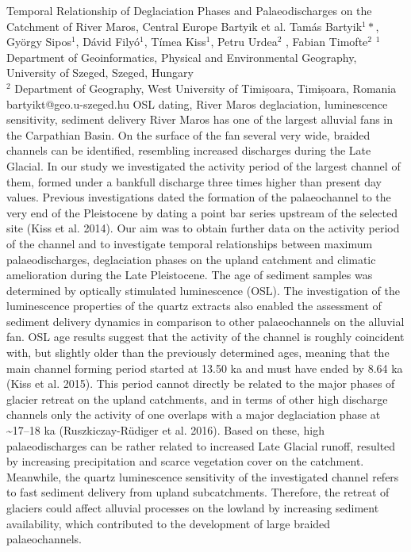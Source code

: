 \abstract
{Temporal Relationship of Deglaciation Phases and Palaeodischarges on the Catchment of River Maros, Central Europe} %
{Bartyik et al.} %
{Tamás Bartyik$^1*$, György Sipos$^1$, Dávid Filyó$^1$, Tímea Kiss$^1$, Petru Urdea$^2$ , Fabian Timofte$^2$} %
{\KLtag} %
{$^1$Department of Geoinformatics, Physical and Environmental Geography, University of Szeged, Szeged, Hungary\\
$^2$ Department of Geography, West University of Timișoara, Timișoara, Romania
} %
{bartyikt@geo.u-szeged.hu}  %
{OSL dating, River Maros deglaciation, luminescence sensitivity, sediment delivery}%
{River Maros has one of the largest alluvial fans in the Carpathian Basin. On the surface of the fan several very wide, braided channels can be identified, resembling increased discharges during the Late Glacial. In our study we investigated the activity period of the largest channel of them, formed under a bankfull discharge three times higher than present day values. Previous investigations dated the formation of the palaeochannel to the very end of the Pleistocene by dating a point bar series upstream of the selected site (Kiss et al. 2014). Our aim was to obtain further data on the activity period of the channel and to investigate temporal relationships between maximum palaeodischarges, deglaciation phases on the upland catchment and climatic amelioration during the Late Pleistocene. The age of sediment samples was determined by optically stimulated luminescence (OSL). The investigation of the luminescence properties of the quartz extracts also enabled the assessment of sediment delivery dynamics in comparison to other palaeochannels on the alluvial fan. 
OSL age results suggest that the activity of the channel is roughly coincident with, but slightly older than the previously determined ages, meaning that the main channel forming period started at 13.50 ka and must have ended by 8.64 ka (Kiss et al. 2015). This period cannot directly be related to the major phases of glacier retreat on the upland catchments, and in terms of other high discharge channels only the activity of one overlaps with a major deglaciation phase at \textasciitilde17--18 ka (Ruszkiczay-Rüdiger et al. 2016). Based on these, high palaeodischarges can be rather related to increased Late Glacial runoff, resulted by increasing precipitation and scarce vegetation cover on the catchment. Meanwhile, the quartz luminescence sensitivity of the investigated channel refers to fast sediment delivery from upland subcatchments. Therefore, the retreat of glaciers could affect alluvial processes on the lowland by increasing sediment availability, which contributed to the development of large braided palaeochannels.
}%
